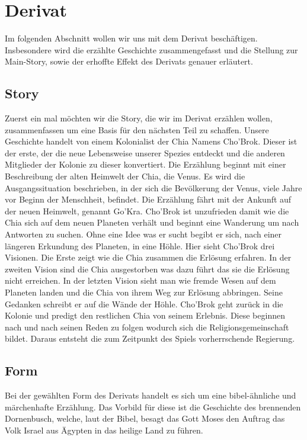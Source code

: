 \documentclass[12pt]{article}
\begin{document}
	\section{Derivat}\label{derivat}
 		Im folgenden Abschnitt wollen wir uns mit dem Derivat beschäftigen. Insbesondere wird die erzählte Geschichte zusammengefasst und die Stellung zur Main-Story, sowie der erhoffte Effekt des Derivats genauer erläutert.
 	\subsection{Story}
 		Zuerst ein mal möchten wir die Story, die wir im Derivat erzählen wollen, zusammenfassen um eine Basis für den nächsten Teil zu schaffen. Unsere Geschichte handelt von einem Kolonialist der Chia Namens Cho'Brok. Dieser ist der erste, der die neue Lebensweise unserer Spezies entdeckt und die anderen Mitglieder der Kolonie zu dieser konvertiert. Die Erzählung beginnt mit einer Beschreibung der alten Heimwelt der Chia, die Venus. Es wird die Ausgangssituation beschrieben, in der sich die Bevölkerung der Venus, viele Jahre vor Beginn der Menschheit, befindet. Die Erzählung fährt mit der Ankunft auf der neuen Heimwelt, genannt \glqq Go'Kra\grqq. Cho'Brok ist unzufrieden damit wie die Chia sich auf dem neuen Planeten verhält und beginnt eine Wanderung um nach Antworten zu suchen. Ohne eine Idee was er sucht begibt er sich, nach einer längeren Erkundung des Planeten, in eine Höhle. Hier sieht Cho'Brok drei Visionen. Die Erste zeigt wie die Chia zusammen die Erlösung erfahren. In der zweiten Vision sind die Chia ausgestorben was dazu führt das sie die Erlösung nicht erreichen. In der letzten Vision sieht man wie fremde Wesen auf dem Planeten landen und die Chia von ihrem Weg zur Erlösung abbringen. Seine Gedanken schreibt er auf die Wände der Höhle. Cho'Brok geht zurück in die Kolonie und predigt den restlichen Chia von seinem Erlebnis. Diese beginnen nach und nach seinen Reden zu folgen wodurch sich die Religionsgemeinschaft bildet. Daraus entsteht die zum Zeitpunkt des Spiels vorherrschende Regierung.

 	\subsection{Form}
 		Bei der gewählten Form des Derivats handelt es sich um eine bibel-ähnliche und märchenhafte Erzählung. Das Vorbild für diese ist die Geschichte des brennenden Dornenbusch, welche, laut der Bibel, besagt das Gott Moses den Auftrag das Volk Israel aus Ägypten in das heilige Land zu führen.
\end{document}

